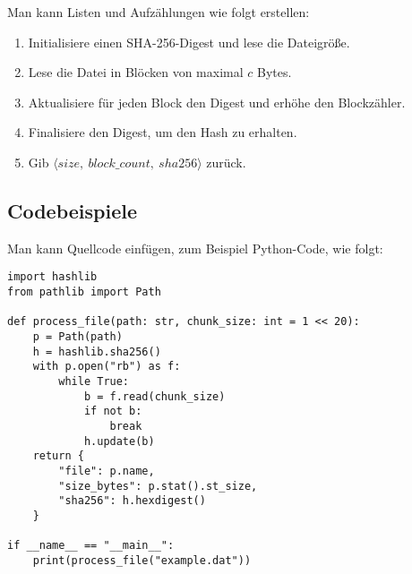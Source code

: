 Man kann Listen und Aufzählungen wie folgt erstellen:

\begin{enumerate}
    \item Initialisiere einen SHA-256-Digest und lese die Dateigröße.
    \item Lese die Datei in Blöcken von maximal $c$ Bytes.
    \item Aktualisiere für jeden Block den Digest und erhöhe den Blockzähler.
    \item Finalisiere den Digest, um den Hash zu erhalten.
    \item Gib $\langle size,\ block\_count,\ sha256 \rangle$ zurück.
\end{enumerate}

\subsection{Codebeispiele}

Man kann Quellcode einfügen, zum Beispiel Python-Code, wie folgt:

\begin{lstlisting}[float=htb, caption={Quellcode des Dateiverarbeitungsalgorithmus.}, label={lst:filehash}]
import hashlib
from pathlib import Path

def process_file(path: str, chunk_size: int = 1 << 20):
    p = Path(path)
    h = hashlib.sha256()
    with p.open("rb") as f:
        while True:
            b = f.read(chunk_size)
            if not b:
                break
            h.update(b)
    return {
        "file": p.name,
        "size_bytes": p.stat().st_size,
        "sha256": h.hexdigest()
    }

if __name__ == "__main__":
    print(process_file("example.dat"))
\end{lstlisting}
